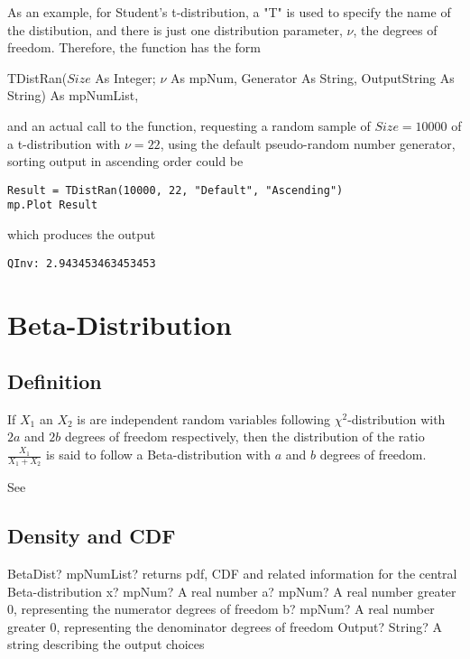 \vspace{0.3cm}
As an example, for Student's t-distribution, a "T" is used to specify the name of the distibution, and there is just one distribution parameter, $\nu$, the degrees of freedom. Therefore,  the function has the form

\vspace{0.3cm}
\textsf{TDistRan($Size$ As Integer; $\nu$ As mpNum, Generator As String, OutputString As String) As mpNumList}, 

\vspace{0.3cm}
and an actual call to the function, requesting a random sample of  $Size=10000$ of a t-distribution with $\nu=22$, using the default pseudo-random number generator, sorting output in ascending order could be

\begin{lstlisting}
Result = TDistRan(10000, 22, "Default", "Ascending")
mp.Plot Result
\end{lstlisting}
which produces the output

\begin{verbatim}
QInv: 2.943453463453453
\end{verbatim}




\section{Beta-Distribution}
\label{BetaDistribution}

\subsection{Definition}
\label{BetaDistributionDefinition}

If $X_1$ an $X_2$ is are independent random variables  following  $\chi^2$-distribution with $2a$ and $2b$ degrees of freedom respectively, 
then the distribution of the ratio $\frac{X_1}{X_1+X_2}$ is said to follow a Beta-distribution with  $a$ and $b$  degrees of freedom.

See \cite{Tretter_1979}


\subsection{Density and CDF}

\begin{mpFunctionsExtract}
	\mpFunctionFour
	{BetaDist? mpNumList? returns pdf, CDF and related information for the central Beta-distribution}
	{x? mpNum? A real number}
	{a? mpNum? A real number greater 0, representing the numerator  degrees of freedom}
	{b? mpNum? A real number greater 0, representing the denominator degrees of freedom}
	{Output? String? A string describing the output choices}
\end{mpFunctionsExtract}



